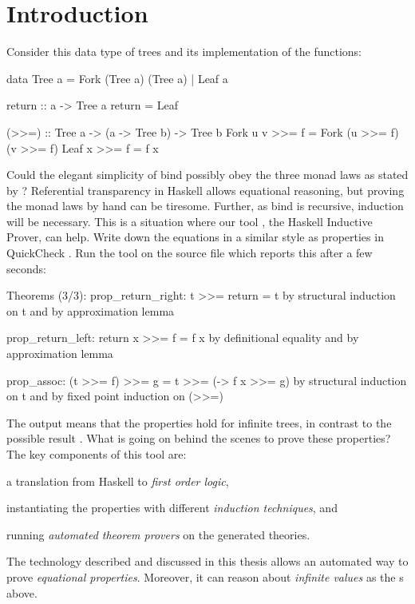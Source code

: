 
\chapter{Introduction}


Consider this data type of trees and its implementation
of the  \citep{mtl} functions:

\begin{code}
data Tree a = Fork (Tree a) (Tree a) | Leaf a

return :: a -> Tree a
return = Leaf

(>>=) :: Tree a -> (a -> Tree b) -> Tree b
Fork u v >>= f = Fork (u >>= f) (v >>= f)
Leaf x   >>= f = f x
\end{code}

\noindent
Could the elegant simplicity of bind possibly obey the three monad
laws as stated by \cite{essenceoffp}? Referential transparency in
Haskell allows equational reasoning, but proving the monad laws by
hand can be tiresome. Further, as bind is recursive, induction will be
necessary. This is a situation where our tool , the Haskell
Inductive Prover, can help. Write down the equations in a similar
style as properties in QuickCheck \citep{quickcheck}. Run the tool on
the source file which reports this after a few seconds:


\begin{code}
Theorems (3/3):
  prop_return_right: t >>= return = t
    by structural induction on t and by approximation lemma

  prop_return_left: return x >>= f = f x
    by definitional equality and by approximation lemma

  prop_assoc: (t >>= f) >>= g = t >>= (\x -> f x >>= g)
    by structural induction on t and by fixed point induction on (>>=)
\end{code}

\noindent
The output  means that the properties hold for infinite
trees, in contrast to the possible result .
What is going on behind the scenes to prove these properties? The key
components of this tool are:

\begin{enumerate}
{\setlength\itemindent{18pt} \item a translation from Haskell to \emph{first order logic},}
{\setlength\itemindent{18pt} \item instantiating the properties with different \emph{induction techniques}, and}
{\setlength\itemindent{18pt} \item running \emph{automated theorem provers} on the generated theories.}
\end{enumerate}
The technology described and discussed in this thesis allows an
automated way to prove \emph{equational properties}. Moreover, it can
reason about \emph{infinite values} as the s above.


